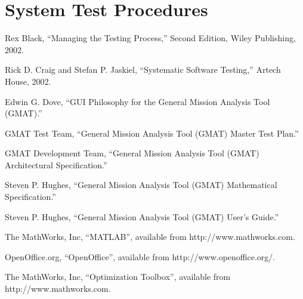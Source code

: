 \documentclass[letterpaper,10pt]{book}
\begin{document}


\part{System Test Procedures}
\thispagestyle{empty}









%
%
%
%
%
%
%
%
\backmatter

\begin{thebibliography}{poseidon} %

 Rex Black, ``Managing the Testing Process,'' Second Edition, Wiley
Publishing, 2002.

 Rick D. Craig and Stefan P. Jaskiel, ``Systematic Software Testing,'' Artech
House, 2002.

 Edwin G. Dove, ``GUI Philosophy for the General Mission Analysis Tool
(GMAT).''

 GMAT Test Team, ``General Mission Analysis Tool (GMAT) Master Test Plan.''

 GMAT Development Team, ``General Mission Analysis Tool (GMAT) Architectural
Specification.''

 Steven P. Hughes, ``General Mission Analysis Tool (GMAT) Mathematical
Specification.''

 Steven P. Hughes, ``General Mission Analysis Tool (GMAT) User's Guide.''

 The MathWorks, Inc, ``MATLAB'', available from http://www.mathworks.com.

 OpenOffice.org, ``OpenOffice'', available from http://www.openoffice.org/.

 The MathWorks, Inc, ``Optimization Toolbox'', available from
http://www.mathworks.com.


\end{thebibliography}
\end{document}
